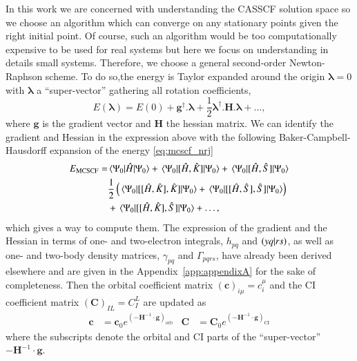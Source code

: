 \documentclass[aps,prb,reprint,showkeys,superscriptaddress]{revtex4-1}
\begin{document}
In this work we are concerned with understanding the CASSCF solution space so we choose an algorithm which can converge on any stationary points given the right initial point.
Of course, such an algorithm would be too computationally expensive to be used for real systems but here we focus on understanding in details small systems.
Therefore, we choose a general second-order Newton-Raphson scheme. \cite{Olsen_1983}
To do so,the energy is Taylor expanded around the origin $\bm{\lambda}=0$ with $\bm{\lambda}$ a ``super-vector'' gathering all rotation coefficients,
\begin{equation}
  \label{eq:mcscf_nrj_taylor}
  E(\bm{\lambda}) = E(0) + \bm{g}^\dagger.\bm{\lambda} + \frac{1}{2} \bm{\lambda}^\dagger.\boldsymbol{H}.\bm{\lambda} + \dots,
\end{equation}
where $\bm{g}$ is the gradient vector and $\bm{H}$ the hessian matrix.
We can identify the gradient and Hessian in the expression above with the following Baker-Campbell-Hausdorff expansion of the energy \eqref{eq:mcscf_nrj}
\begin{equation}
  \label{eq:mcscf_nrj_bch}
  \begin{split}
    E_{\text{MCSCF}} = &\mel{\Psi_0}{\Hat{H}}{\Psi_0} + \mel{\Psi_0}{[\Hat{H},\Hat{K}]}{\Psi_0} + \mel{\Psi_0}{[\Hat{H},\Hat{S}]}{\Psi_0}  \\
    &\frac{1}{2} \left(\mel{\Psi_0}{[[\Hat{H},\Hat{K}],\Hat{K}]}{\Psi_0}+ \mel{\Psi_0}{[[\Hat{H},\Hat{S}],\Hat{S}]}{\Psi_0}\right) \\
    &+ \mel{\Psi_0}{[[\Hat{H},\Hat{K}],\Hat{S}]}{\Psi_0} + \dots,
  \end{split}
\end{equation}
which gives a way to compute them.
The expression of the gradient and the Hessian in terms of one- and two-electron integrals, $h_{pq}$ and  $\ceri{yq}{rs}$, as well as one- and two-body density matrices, $\gamma_{pq}$ and $\Gamma_{pqrs}$, have already been derived elsewhere \cite{Olsen_1983} and are given in the Appendix~\ref{app:appendixA} for the sake of completeness.
Then the orbital coefficient matrix $(\bm{c})_{i \mu} = c_i^\mu$ and the CI coefficient matrix $(\bm{C})_{IL} = C_I^L$ are updated as
\begin{align}
  \bm{c} &= \bm{c}_0 e^{(-\bm{H}^{-1}\cdot \bm{g})_{\text{orb}}} & \bm{C} &= \bm{C}_0 e^{(-\bm{H}^{-1}\cdot \bm{g})_{\text{CI}}}
\end{align}
where the subscripts denote the orbital and CI parts of the ``super-vector'' $-\bm{H}^{-1}\cdot \bm{g}$.
\end{document}
